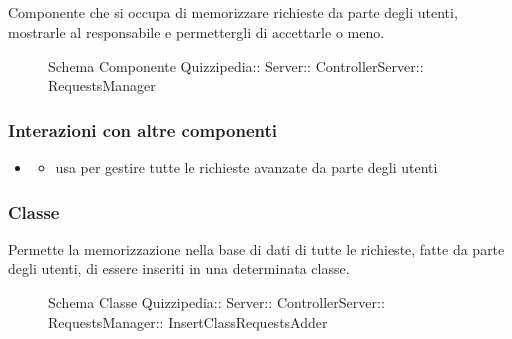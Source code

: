 \subsection{}
Componente che si occupa di memorizzare richieste da parte degli utenti, mostrarle al responsabile e permettergli di accettarle o meno.
\begin{figure}[H]
\centering
\noindent{}
\caption[Schema Componente RequestsManager]{Schema Componente Quizzipedia:: Server:: ControllerServer:: RequestsManager}
\end{figure}
\subsubsection{Interazioni con altre componenti}
\begin{itemize}
\item {}
\begin{itemize}
\item usa  per gestire tutte le richieste avanzate da parte degli utenti
\end{itemize}
\end{itemize}
\subsubsection{Classe }
Permette la memorizzazione nella base di dati di tutte le richieste, fatte da parte degli utenti, di essere inseriti in una determinata classe.
\begin{figure}[H]
\centering
\noindent{}
\caption[Schema Classe InsertClassRequestsAdder]{Schema Classe Quizzipedia:: Server:: ControllerServer:: RequestsManager:: InsertClassRequestsAdder}
\end{figure}
